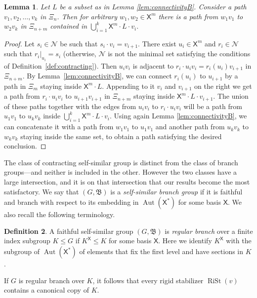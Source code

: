 \documentclass[11pt]{amsart}
\newcommand{\bim}{\mathfrak{B}}
\newcommand{\xs}{\alb^\ast}
\newcommand{\aut}{\ensuremath{\operatorname{Aut}}}%
\newcommand{\rist}{\ensuremath{\operatorname{RiSt}}}%
\newcommand{\alb}{\ensuremath{\mathsf{X}}}%
\newcommand{\nuke}{\ensuremath{\mathcal{N}}}%
\theoremstyle{definition}
\newtheorem{defin}{Definition}[section]
\theoremstyle{plain}
\newtheorem{main thm}{Theorem}
\newtheorem{lemma}[defin]{Lemma}
\theoremstyle{remark}
\theoremstyle{plain}
\begin{document}
\begin{lemma}
    \label{lem:extendingpaths}
Let $L$ be a subset as in Lemma \ref{lem:connectivityB}. Consider a path $v_1, v_2, \ldots, v_k$ in $\Xi_n$. Then for arbitrary $w_1, w_2\in\alb^m$ there is a path from $w_1v_1$ to $w_2v_k$ in $\Xi_{n+m}$ contained in $\bigcup_{i=1}^k \alb^m\cdot L\cdot v_i$. 
\end{lemma}

\begin{proof}
    Let $s_i\in\nuke$ be such that $s_i\cdot v_i=v_{i+1}$. There exist $u_i\in\alb^m$ and $r_i\in\nuke$ such that $r_i|_{u_i}=s_i$ (otherwise, $\nuke$ is not the minimal set satisfying the conditions of Definition~\ref{def:contracting}). Then $u_iv_i$ is adjacent to $r_i\cdot u_iv_i=r_i(u_i)v_{i+1}$ in $\Xi_{n+m}$. By Lemma~\ref{lem:connectivityB}, we can connect $r_i(u_i)$ to $u_{i+1}$ by a path in $\Xi_m$ staying inside $\alb^m\cdot L$. Appending to it $v_i$ and $v_{i+1}$ on the right we get a path from $r_i\cdot u_iv_i$ to $u_{i+1}v_{i+1}$ in $\Xi_{n+m}$ staying inside $\alb^m\cdot L\cdot v_{i+1}$. The union of these paths together with the edges from $u_iv_i$ to $r_i\cdot u_iv_i$ will be a path from $u_1v_1$ to $u_kv_k$ inside $\bigcup_{i=1}^k \alb^m\cdot L\cdot v_i$. Using again Lemma \ref{lem:connectivityB}, we can concatenate it with a path from $w_1v_1$ to $u_1v_1$ and another path from $u_kv_k$ to $w_kv_k$ staying inside the same set, to obtain a path satisfying the desired conclusion.
\end{proof}


The class of contracting self-similar group is distinct from the class of branch groups---and neither is included in the other. However the two classes have a large intersection, and it is on that intersection that our results become the most satisfactory. 
 We say that $(G, \bim)$ is a \emph{self-similar branch group} if it is faithful and branch with respect to its embedding in $\aut(\xs)$ for some basis $\alb$. We also recall the following terminology.
 
 \begin{defin}
     A faithful self-similar group $(G, \bim)$ is \emph{regular branch} over a finite index subgroup $K\le G$ if $K^{\alb}\le K$ for some basis $\alb$. Here we identify $K^{\alb}$ with the subgroup of $\aut(\xs)$ of elements that fix the first level and have sections in $K$.
 \end{defin} If $G$ is regular branch over $K$, it follows that every rigid stabilizer $\rist(v)$ contains a canonical copy of $K$.
\end{document}
